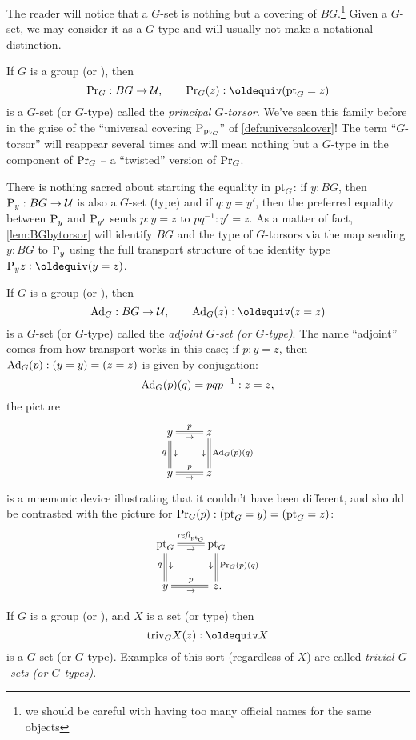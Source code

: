 The reader will notice that a $G$-set is nothing but a covering of $BG$.\footnote{we should be careful with having too many official names for the same objects}
Given a $G$-set, we may consider it as a $G$-type and will usually not make a notational distinction.

\begin{example}\label{def:principaltorsor}
  If $G$ is a group (or \inftygp), then
$$\princ G:BG\to\UU,\qquad\princ G(z)\defequi(\pt_G=z)$$ is a $G$-set (or $G$-type) called the \emph{principal $G$-torsor}.  We've seen this family before in the guise of the ``universal covering $\mathrm{P}_{{\mathord{\mathrm{pt}}}_G}$'' of \cref{def:universalcover}!  
The term ``$G$-torsor'' will reappear several times and will mean nothing but a $G$-type in the component of $\mathrm{Pr}_{{G}}$ -- a ``twisted'' version of $\mathrm{Pr}_{{G}}$.

There is nothing sacred about starting the equality in ${\mathord{\mathrm{pt}}}_G$: if $y:BG$, then $\mathrm{P}_{y}:BG\to\mathcal{U}$ is also a $G$-set (type) and if $q:y=y'$, then the preferred equality between $\mathrm{P}_{y}$ and $\mathrm{P}_{y'}$ sends $p:y=z$ to $pq^{-1}:y'=z$.  As a matter of fact, \cref{lem:BGbytorsor} will identify $BG$ and the type of $G$-torsors via the map sending $y:BG$ to $\mathrm{P}_{y}$ using the full transport structure of the identity type $\pathsp yz\defequi(y=z)$.
 
\end{example}

\begin{example}\label{def:adjointrep}
  If $G$ is a group (or \inftygp), then
$$\Ad_G:BG\to\UU,\qquad\Ad_G(z)\defequi(z=z)$$ is a $G$-set (or $G$-type) called the \emph{adjoint $G$-set (or $G$-type)}.  The name ``adjoint'' comes from how transport works in this case; if $p:y=z$, then $\mathrm{Ad}_G(p):(y=y)=(z=z)$ is given by conjugation: 
$$\mathrm{Ad}_G(p)(q)=pqp^{-1}:z=z,$$ the picture
$$\xymatrix{y\ar@{=}[r]^p_\to\ar@{=}[d]_q^\downarrow&z\ar@{=}[d]^{\Ad_G(p)(q)}_\downarrow\\
y\ar@{=}[r]^p_\to&z}$$
is a mnemonic device illustrating that it couldn't have been different, and should be contrasted with the picture for $\mathrm{Pr}_{{G}} (p):({\mathord{\mathrm{pt}}}_G=y)=({\mathord{\mathrm{pt}}}_G=z)$:
$$\xymatrix{\pt_G\ar@{=}[r]^{\refl{\pt_G}}_\to\ar@{=}[d]_q^\downarrow&\pt_G\ar@{=}[d]^{\princ G(p)(q)}_\downarrow\\
y\ar@{=}[r]^p_\to&\,z.}$$  
\end{example}
\begin{example}\label{def:trivGset}
  If $G$ is a group (or \inftygp), and $X$ is a set (or type) then
$$\mathrm{triv}_GX(z)\defequi X$$ is a $G$-set (or $G$-type).  Examples of this sort (regardless of $X$) are called \emph{trivial $G$-sets (or $G$-types)}.
\end{example}

